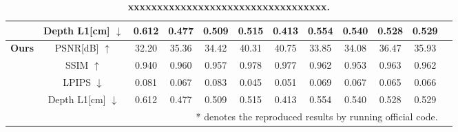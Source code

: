 \documentclass{article}
\begin{document}
\begin{table}[t]
\begin{tabular}{l|c|cccccccccc}
    & Depth L1[cm] $\downarrow$  & 0.612       & 0.477        & 0.509        & 0.515        
                             & 0.413       & 0.554        & 0.540        & 0.528        & 0.529    \\

\midrule

\multirow{4}{*}{\textbf{Ours}}
    & PSNR[dB] $\uparrow$    & \cellcolor{tabthird}32.20            & \cellcolor{tabthird}35.36             & \cellcolor{tabthird}34.42             & \cellcolor{tabthird}40.31     
                             & \cellcolor{tabthird}40.75            & \cellcolor{tabthird}33.85             & \cellcolor{tabthird}34.08             & \cellcolor{tabthird}36.47     & \cellcolor{tabthird}35.93    \\
                                                                     
    & SSIM $\uparrow$        & \cellcolor{tabthird}0.940            & \cellcolor{tabthird}0.960             & \cellcolor{tabthird}0.957             & \cellcolor{tabthird}0.978    
                             & \cellcolor{tabthird}0.977            & \cellcolor{tabthird}0.962             & \cellcolor{tabthird}0.953             & \cellcolor{tabthird}0.963     & \cellcolor{tabthird}0.962    \\
                                            
    & LPIPS $\downarrow$     & \cellcolor{tabthird}0.081            & \cellcolor{tabthird}0.067             & \cellcolor{tabthird}0.083             & \cellcolor{tabthird}0.045     
                             & \cellcolor{tabthird}0.051            & \cellcolor{tabthird}0.069             & \cellcolor{tabthird}0.067             & \cellcolor{tabthird}0.065     & \cellcolor{tabthird}0.066    \\
                             
    & Depth L1[cm] $\downarrow$  & 0.612       & 0.477        & 0.509        & 0.515        
                             & 0.413       & 0.554        & 0.540        & 0.528        & 0.529    \\

                                            
\bottomrule
\multicolumn{11}{r}{* denotes the reproduced results by running official code.}



\end{tabular}
\caption{\textbf{xxxxxxxxxxxxxxxxxxxxxxxxxxxxxxxxxx.}}
\end{table}
\end{document}
